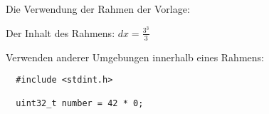 
Die Verwendung der Rahmen der Vorlage:

\begin{Frame}
  Der Inhalt des Rahmens:
  $dx=\frac{3^3}{3}$
\end{Frame}

\begin{Frame}
  Verwenden anderer Umgebungen innerhalb eines Rahmens:

  \begin{lstlisting}
  #include <stdint.h>

  uint32_t number = 42 * 0;
  \end{lstlisting}
\end{Frame}
